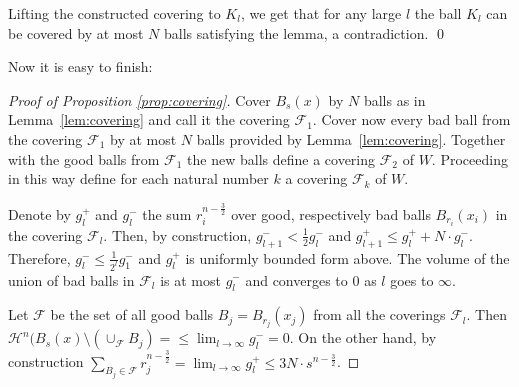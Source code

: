 \documentclass[12pt,leqno]{amsart}
\numberwithin{equation}{section}
\theoremstyle{definition}
\theoremstyle{remark}
\newcommand{\lref}[1]{Lemma~\ref{#1}}
\def\qeds{\qed\par\medskip}
\begin{document}
Lifting the constructed covering to $K_l$,
we get that for any large $l$
the ball $K_l$ can be covered by at most $N$ balls satisfying the lemma,
a contradiction.
\qeds

Now it is easy to finish:
\begin{proof}[Proof of Proposition \ref{prop:covering}]
Cover $B_{s} (x)$ by $N$ balls as in \lref{lem:covering}  and call it the covering $\mathcal F_1$.  Cover now every bad
 ball from the covering $\mathcal F_1$ by at most $N$ balls provided by  \lref{lem:covering}. Together with the good balls from $\mathcal F_1$ the new balls define a covering $\mathcal F_2$ of $W$. Proceeding in this way define for each natural number $k$ a covering $\mathcal F_k$ of $W$.

 Denote by $g_l^{+}$ and $g_l ^-$ the sum $r_i ^{n-\frac32}$ over good, respectively bad balls $B_{r_i} (x_i)$ in the covering $\mathcal F_l$.
 Then, by construction, $g_{l+1} ^- < \frac 1 2 g_l ^-$ and $g_{l+1} ^+ \leq g_l ^+ + N\cdot g_l ^-$. Therefore, $g_l^- \leq \frac 1 {2^l} g_1 ^-$
 and $g_l^+$ is uniformly bounded form above.
 The volume of the union of bad balls in $\mathcal F_l$ is at most $g_l^-$ and converges to $0$ as $l$ goes to $\infty$.

 Let  $\mathcal F$ be the set of all good balls $B_j =B_{r_j} (x_j)$ from all the  coverings $\mathcal F_l$.
   Then $\mathcal H^n (B_s (x) \setminus (\cup _{\mathcal F} B_j  )  = \leq  \lim _{l\to \infty} g_l ^- =0$.  On the other hand,
   by construction $\sum _{B_j\in \mathcal F} r_j^{n- \frac 3 2} = \lim _{l\to \infty} g_l^+  \leq  3N \cdot s^{n- \frac 3 2}$.
\end{proof}
\end{document}
